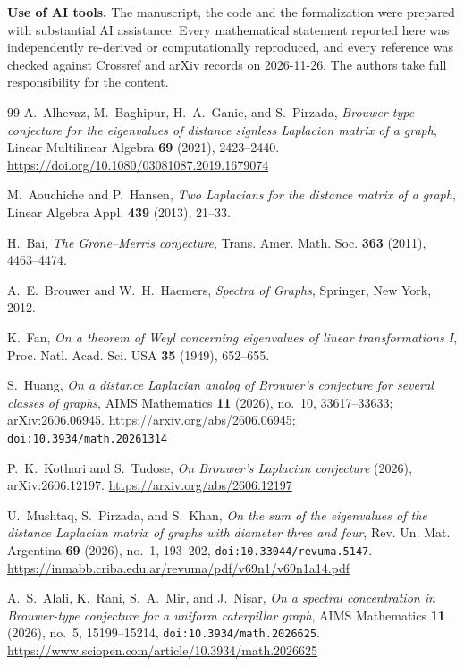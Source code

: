 \documentclass[11pt,a4paper]{article}
\theoremstyle{remark}
\begin{document}
\noindent\textbf{Use of AI tools.}
The manuscript, the code and the formalization were prepared with substantial AI assistance. Every mathematical statement reported here was independently re-derived or computationally reproduced, and every reference was checked against Crossref and arXiv records on 2026-11-26. The authors take full responsibility for the content.

\begin{thebibliography}{99}
A.~Alhevaz, M.~Baghipur, H.~A.~Ganie, and S.~Pirzada,
\emph{Brouwer type conjecture for the eigenvalues of distance signless Laplacian matrix of a graph},
Linear Multilinear Algebra \textbf{69} (2021), 2423--2440.
\url{https://doi.org/10.1080/03081087.2019.1679074}

M.~Aouchiche and P.~Hansen,
\emph{Two Laplacians for the distance matrix of a graph},
Linear Algebra Appl. \textbf{439} (2013), 21--33.

H.~Bai,
\emph{The Grone--Merris conjecture},
Trans. Amer. Math. Soc. \textbf{363} (2011), 4463--4474.

A.~E.~Brouwer and W.~H.~Haemers,
\emph{Spectra of Graphs},
Springer, New York, 2012.

K.~Fan,
\emph{On a theorem of Weyl concerning eigenvalues of linear transformations I},
Proc. Natl. Acad. Sci. USA \textbf{35} (1949), 652--655.

S.~Huang,
\emph{On a distance Laplacian analog of Brouwer's conjecture for several classes of graphs},
AIMS Mathematics \textbf{11} (2026), no.~10, 33617--33633; arXiv:2606.06945.
\url{https://arxiv.org/abs/2606.06945}; \texttt{doi:10.3934/math.20261314}

P.~K.~Kothari and S.~Tudose,
\emph{On Brouwer's Laplacian conjecture} (2026), arXiv:2606.12197.
\url{https://arxiv.org/abs/2606.12197}

U.~Mushtaq, S.~Pirzada, and S.~Khan,
\emph{On the sum of the eigenvalues of the distance Laplacian matrix of graphs with diameter three and four},
Rev. Un. Mat. Argentina \textbf{69} (2026), no.~1, 193--202, \texttt{doi:10.33044/revuma.5147}.
\url{https://inmabb.criba.edu.ar/revuma/pdf/v69n1/v69n1a14.pdf}

A.~S.~Alali, K.~Rani, S.~A.~Mir, and J.~Nisar,
\emph{On a spectral concentration in Brouwer-type conjecture for a uniform caterpillar graph},
AIMS Mathematics \textbf{11} (2026), no.~5, 15199--15214, \texttt{doi:10.3934/math.2026625}.
\url{https://www.sciopen.com/article/10.3934/math.2026625}


\end{thebibliography}
\end{document}

